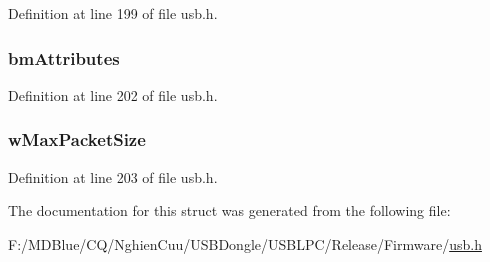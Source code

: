 Definition at line 199 of file usb.h.

\hypertarget{struct___u_s_b___e_n_d_p_o_i_n_t___d_e_s_c_r_i_p_t_o_r_a5ca38633eddd8c1c055694e5c2c5e566}{
\subsubsection[{bmAttributes}]{ {\bf bmAttributes}}}
\label{struct___u_s_b___e_n_d_p_o_i_n_t___d_e_s_c_r_i_p_t_o_r_a5ca38633eddd8c1c055694e5c2c5e566}


Definition at line 202 of file usb.h.

\hypertarget{struct___u_s_b___e_n_d_p_o_i_n_t___d_e_s_c_r_i_p_t_o_r_a77f1aab9a5262fe467eb67358cc171fc}{
\subsubsection[{wMaxPacketSize}]{ {\bf wMaxPacketSize}}}
\label{struct___u_s_b___e_n_d_p_o_i_n_t___d_e_s_c_r_i_p_t_o_r_a77f1aab9a5262fe467eb67358cc171fc}


Definition at line 203 of file usb.h.



The documentation for this struct was generated from the following file:\begin{DoxyCompactItemize}
\item 
F:/MDBlue/CQ/NghienCuu/USBDongle/USBLPC/Release/Firmware/\hyperlink{usb_8h}{usb.h}\end{DoxyCompactItemize}
